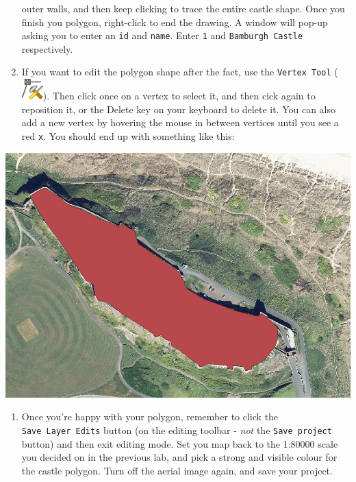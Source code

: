 \documentclass[
  letterpaper,
  DIV=11,
  numbers=noendperiod]{scrreprt}
\providecommand{\tightlist}{%
  \setlength{\itemsep}{0pt}\setlength{\parskip}{0pt}}\usepackage{longtable,booktabs,array}
\begin{document}
\begin{enumerate}
  outer walls, and then keep clicking to trace the entire castle shape.
  Once you finish you polygon, right-click to end the drawing. A window
  will pop-up asking you to enter an \texttt{id} and \texttt{name}.
  Enter \texttt{1} and \texttt{Bamburgh\ Castle} respectively.
\item
  If you want to edit the polygon shape after the fact, use the
  \texttt{Vertex\ Tool}
  (\includegraphics{index_files/mediabag/mActionVertexToolAct.png}).
  Then click once on a vertex to select it, and then cick again to
  reposition it, or the Delete key on your keyboard to delete it. You
  can also add a new vertex by hovering the mouse in between vertices
  until you see a red \texttt{x}. You should end up with something like
  this:
\end{enumerate}

\includegraphics{images/lab_8/lab8_fig4_digitsed_castle.jpg}

\begin{enumerate}
\def\labelenumi{(\arabic{enumi})}
\setcounter{enumi}{227}
\tightlist
\item
  Once you're happy with your polygon, remember to click the
  \texttt{Save\ Layer\ Edits} button (on the editing toolbar -
  \emph{not} the \texttt{Save\ project} button) and then exit editing
  mode. Set you map back to the 1:80000 scale you decided on in the
  previous lab, and pick a strong and visible colour for the castle
  polygon. Turn off the aerial image again, and save your project.
\end{enumerate}
\end{document}
